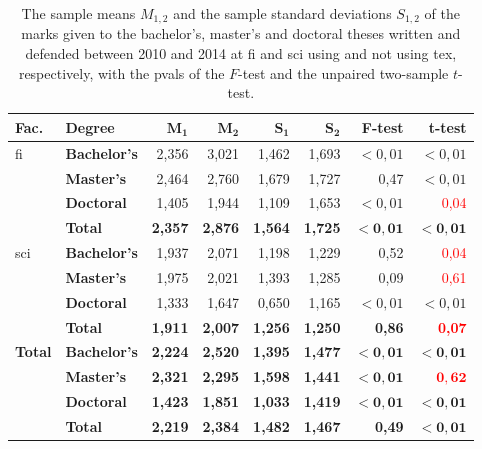   \begin{table}
      \begin{tabularx}{\textwidth}{Xlrrrrrr}
        \bf Fac. & \bf Degree & $\mathbf{M_1}$ & $\mathbf{M_2}$ & $\mathbf{S_1}$ & $\mathbf{S_2}$ & \bf F-test & \bf t-test \\
      \hline
      \acrshort{fi}
      & \textbf{Bachelor's} & 2,356 & 3,021 & 1,462 & 1,693 & $<0{,}01$ & \textcolor{OliveGreen}{$<0{,}01$} \\
        & \textbf{Master's}   & 2,464 & 2,760 & 1,679 & 1,727 & 0,47 & \textcolor{OliveGreen}{$<0{,}01$} \\
        & \textbf{Doctoral}   & 1,405 & 1,944 & 1,109 & 1,653 & $<0{,}01$ & \textcolor{red}{0,04} \\
        & \textbf{Total}      & \bf 2,357 & \bf 2,876 \bf & \bf 1,564 & \bf 1,725 & $\mathbf{<0{,}01}$ & \textcolor{OliveGreen}{$\mathbf{<0{,}01}$}\\

      \acrshort{sci}
        & \textbf{Bachelor's} & 1,937 & 2,071 & 1,198 & 1,229 & 0,52 & \textcolor{red}{0,04} \\
        & \textbf{Master's}   & 1,975 & 2,021 & 1,393 & 1,285 & 0,09 & \textcolor{red}{0,61} \\
        & \textbf{Doctoral}   & 1,333 & 1,647 & 0,650 & 1,165 & $<0{,}01$ & \textcolor{OliveGreen}{$<0{,}01$} \\

        & \textbf{Total}      & \bf 1,911 & \bf 2,007 & \bf 1,256 & \bf 1,250 & \bf 0,86 & \textcolor{red}{\bf 0,07} \\
      \hline
      \textbf{Total} 
      & \textbf{Bachelor's} & \bf 2,224 & \bf 2,520 & \bf 1,395 & \bf 1,477 & $\mathbf{<0{,}01}$ & \textcolor{OliveGreen}{$\mathbf{<0{,}01}$} \\
      & \textbf{Master's} & \bf 2,321 & \bf 2,295 & \bf 1,598 & \bf 1,441 & $\mathbf{<0{,}01}$ & \textcolor{red}{$\mathbf{0{,}62}$} \\
      & \textbf{Doctoral} & \bf 1,423 & \bf 1,851 & \bf 1,033 & \bf 1,419 & $\mathbf{<0{,}01}$ & \textcolor{OliveGreen}{$\mathbf{<0{,}01}$} \\
      & \textbf{Total}    & \bf 2,219 & \bf 2,384 & \bf 1,482 & \bf 1,467 & \bf 0,49 & \textcolor{OliveGreen}{$\mathbf{<0{,}01}$} \\
    \end{tabularx}
    \caption{The sample means $M_{1,2}$ and the sample standard deviations $S_{1,2}$ of the marks given to the bachelor's, master's and doctoral theses written and defended between 2010 and 2014 at \gls{fi} and \gls{sci} using and not using \gls{tex}, respectively, with the \glspl{pval} of the $F$-test and the unpaired two-sample $t$-test.}
    \label{table:statistics-tex-marks}
  \end{table}
  

